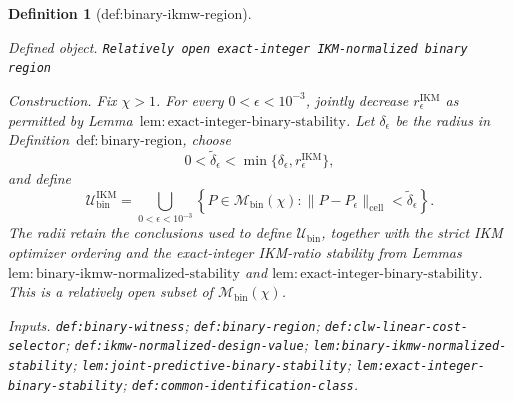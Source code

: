 \documentclass{article}
\newtheorem{definition}{Definition}
\begin{document}
\begin{definition}[def:binary-ikmw-region]\label{def:binary-ikmw-region}
\par\smallskip\noindent\emph{Defined object.} \texttt{Relatively open exact-\allowbreak{}integer IKM-\allowbreak{}normalized binary region}
\par\smallskip\noindent\emph{Construction.} Fix \(\chi>1\).  For every \(0<\epsilon<10^{-3}\), jointly decrease \(r_\epsilon^{\mathrm{IKM}}\) as permitted by Lemma~\(\mathrm{lem{:}exact\text{-}integer\text{-}binary\text{-}stability}\).  Let \(\delta_\epsilon\) be the radius in Definition~\(\mathrm{def{:}binary\text{-}region}\), choose
\[
 0<\widetilde\delta_\epsilon
 <\min\{\delta_\epsilon,r_\epsilon^{\mathrm{IKM}}\},
\]
and define
\[
 \mathcal U_{\mathrm{bin}}^{\mathrm{IKM}}
 =\bigcup_{0<\epsilon<10^{-3}}
 \left\{P\in\mathcal M_{\mathrm{bin}}(\chi):
 \|P-P_\epsilon\|_{\mathrm{cell}}<\widetilde\delta_\epsilon\right\}. \tag{1}
\]
The radii retain the conclusions used to define \(\mathcal U_{\mathrm{bin}}\), together with the strict IKM optimizer ordering and the exact-integer IKM-ratio stability from Lemmas~\(\mathrm{lem{:}binary\text{-}ikmw\text{-}normalized\text{-}stability}\) and \(\mathrm{lem{:}exact\text{-}integer\text{-}binary\text{-}stability}\).  This is a relatively open subset of \(\mathcal M_{\mathrm{bin}}(\chi)\).
\par\smallskip\noindent\emph{Inputs.} \texttt{def:\allowbreak{}binary-\allowbreak{}witness}; \texttt{def:\allowbreak{}binary-\allowbreak{}region}; \texttt{def:\allowbreak{}clw-\allowbreak{}linear-\allowbreak{}cost-\allowbreak{}selector}; \texttt{def:\allowbreak{}ikmw-\allowbreak{}normalized-\allowbreak{}design-\allowbreak{}value}; \texttt{lem:\allowbreak{}binary-\allowbreak{}ikmw-\allowbreak{}normalized-\allowbreak{}stability}; \texttt{lem:\allowbreak{}joint-\allowbreak{}predictive-\allowbreak{}binary-\allowbreak{}stability}; \texttt{lem:\allowbreak{}exact-\allowbreak{}integer-\allowbreak{}binary-\allowbreak{}stability}; \texttt{def:\allowbreak{}common-\allowbreak{}identification-\allowbreak{}class}.
\end{definition}
\end{document}

